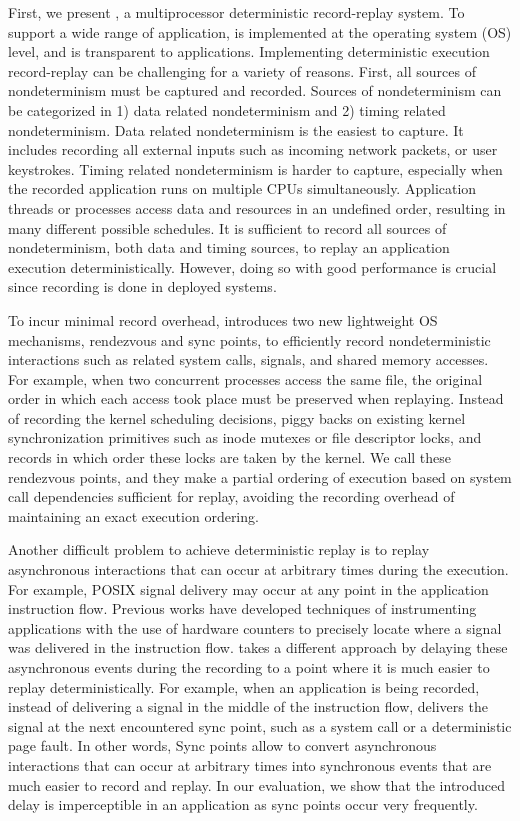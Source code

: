 First, we present \scribe, a multiprocessor deterministic
record-replay system. To support a wide range of application, \scribe is
implemented at the operating system (OS) level, and is transparent to applications.
Implementing deterministic execution record-replay can be challenging for a
variety of reasons. First, all sources of nondeterminism must be captured and
recorded.  Sources of nondeterminism can be categorized in 1) data related
nondeterminism and 2) timing related nondeterminism. Data related nondeterminism
is the easiest to capture. It includes recording all external inputs such as
incoming network packets, or user keystrokes. Timing related nondeterminism is
harder to capture, especially when the recorded application runs on multiple
CPUs simultaneously.  Application threads or processes access data and resources
in an undefined order, resulting in many different possible schedules. It is
sufficient to record all sources of nondeterminism, both data and timing
sources, to replay an application execution deterministically.  However, doing
so with good performance is crucial since recording is done in deployed systems.

To incur minimal record overhead, \scribe introduces two new lightweight OS
mechanisms, rendezvous and sync points, to efficiently record nondeterministic
interactions such as related system calls, signals, and shared memory accesses.
For example, when two concurrent processes access the same file, the original
order in which each access took place must be preserved when replaying.  Instead
of recording the kernel scheduling decisions, \scribe piggy backs on existing
kernel synchronization primitives such as inode mutexes or file descriptor
locks, and records in which order these locks are taken by the kernel.  We call
these rendezvous points, and they make a partial ordering of execution based on
system call dependencies sufficient for replay, avoiding the recording overhead
of maintaining an exact execution ordering.

Another difficult problem to achieve deterministic replay is to replay
asynchronous interactions that can occur at arbitrary times during the
execution. For example, POSIX signal delivery may occur at any point in the
application instruction flow. Previous works have developed techniques
of instrumenting applications with the use of hardware counters to precisely
locate where a signal was delivered in the instruction flow.
\scribe takes a different approach by delaying these asynchronous events
during the recording to a point where it is much easier to replay
deterministically. For example, when an application is being recorded,
instead of delivering a signal in the middle of the instruction flow, \scribe
delivers the signal at the next encountered sync point, such as a system call or
a deterministic page fault. In other words,
Sync points allow \scribe to convert asynchronous interactions that can occur at
arbitrary times into synchronous events that are much easier to record and
replay. In our evaluation, we show that the introduced delay is imperceptible
in an application as sync points occur very frequently.

